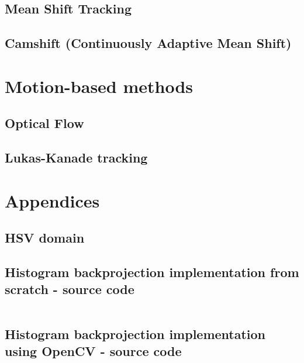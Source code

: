\documentclass[a4paper]{article}
\begin{document}
\subsection{Mean Shift Tracking}




\subsection{Camshift (Continuously Adaptive Mean Shift)}






\section{Motion-based methods}

\subsection{Optical Flow}



\subsection{Lukas-Kanade tracking}





\newpage
\appendix

\section{Appendices}

\newpage
\subsection{HSV domain}
\label{app:hsv_domain}






\newpage
\subsection{Histogram backprojection implementation from scratch - source code}
\label{app:hist_backproj_src}
\inputminted{python}{src/hist_backproj/backproj.py}



\newpage
\subsection{Histogram backprojection implementation using OpenCV - source code}
\label{app:hist_backproj_src_opencv}
\inputminted{python}{src/hist_backproj/backproj_cv.py}
\end{document}

